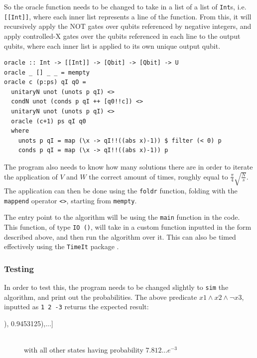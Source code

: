 \documentclass[a4paper,10pt, titlepage, twoside]{article}
\begin{document}
So the oracle function needs to be changed to take in a list of a list of \texttt{Int}s, i.e. \texttt{[[Int]]}, where each inner list represents a line of the function. From this, it will recursively apply the NOT gates over qubits referenced by negative integers, and apply controlled-X gates over the qubits referenced in each line to the output qubits, where each inner list is applied to its own unique output qubit.\par
\begin{verbatim}
oracle :: Int -> [[Int]] -> [Qbit] -> [Qbit] -> U
oracle _ [] _ _ = mempty
oracle c (p:ps) qI qO =
  unitaryN unot (unots p qI) <>
  condN unot (conds p qI ++ [q0!!c]) <>
  unitaryN unot (unots p qI) <>
  oracle (c+1) ps qI q0
  where
    unots p qI = map (\x -> qI!!((abs x)-1)) $ filter (< 0) p
    conds p qI = map (\x -> qI!!((abs x)-1)) p
\end{verbatim}

The program also needs to know how many solutions there are in order to iterate the application of $V$ and $W$ the correct amount of times, roughly equal to $\frac{\pi}{4}\sqrt{\frac{N}{s}}$. The application can then be done using the \texttt{foldr} function, folding with the \texttt{mappend} operator \texttt{<>}, starting from \texttt{mempty}.\par
The entry point to the algorithm will be using the \texttt{main} function in the code. This function, of type \texttt{IO ()}, will take in a custom function inputted in the form described above, and then run the algorithm over it. This can also be timed effectively using the \texttt{TimeIt} package \cite{timeit}.

\subsubsection{Testing}
In order to test this, the program needs to be changed slightly to \texttt{sim} the algorithm, and print out the probabilities. The above predicate $x1 \land x2 \land \neg x3$, inputted as \texttt{1 2 -3} returns the expected result:

\begin{verbbox}
[...,([True, True, False]), 0.9453125),...]
\end{verbbox}

\begin{figure}[H]
    \centering
    \theverbbox
    \\ with all other states having probability $7.812...e^{-3}$
\end{figure}
\end{document}
